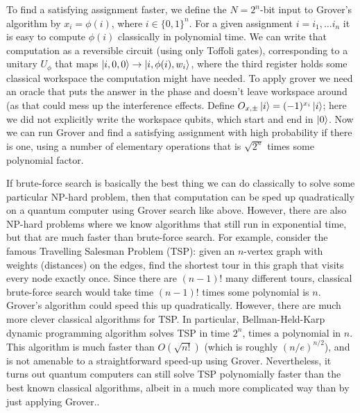 To find a satisfying assignment faster, we define the $N=2^n$-bit input to Grover's algorithm by $x_i=\phi(i)$, where $i\in\{0,1\}^n$. For a given assignment $i=i_1,\ldots i_n$ it is easy to compute $\phi(i)$ classically in polynomial time. We can write that computation as a reversible circuit (using only Toffoli gates), corresponding to a unitary $U_{\phi}$ that maps $\ket{i,0,0}\rightarrow \ket{i,\phi(i),w_i}$, where the third register holds some classical workspace the computation might have needed. To apply grover we need an oracle that puts the answer in the phase and doesn't leave workspace around (as that could mess up the interference effects. Define $O_{x,\pm}\ket{i}=(-1)^{x_i}\ket{i}$; here we did not explicitly write the workspace qubits, which start and end in $\ket{0}$. Now we can run Grover and find a satisfying assignment with high probability if there is one, using a number of elementary operations that is $\sqrt{2^n}$ times some polynomial factor.

If brute-force search is basically the best thing we can do classically to solve some particular NP-hard problem, then that computation can be sped up quadratically on a quantum computer using Grover search like above. However, there are also NP-hard problems where we know algorithms that still run in exponential time, but that are much faster than brute-force search. For example, consider the famous Travelling Salesman Problem (TSP): given an $n$-vertex graph with weights (distances) on the edges, find the shortest tour in this graph that visits every node exactly once. Since there are $(n-1)!$ many different tours, classical brute-force search would take time $(n-1)!$ times some polynomial is $n$. Grover's algorithm could speed this up quadratically. However, there are much more clever classical algorithms for TSP. In particular, Bellman-Held-Karp dynamic programming algorithm solves TSP in time $2^n$, times a polynomial in $n$. This algorithm is much faster than $O(\sqrt{n!})$ (which is roughly $(n/e)^{n/2}$), and is not amenable to a straightforward speed-up using Grover. Nevertheless, it turns out quantum computers can still solve TSP polynomially faster than the best known classical algorithms, albeit in a much more complicated way than by just applying Grover.\cite{ambainis2018quantumspeedupsexponentialtimedynamic}.

